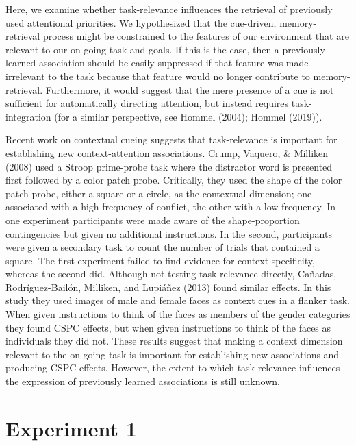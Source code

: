 \documentclass[english,,man,floatsintext]{apa6}
\begin{document}
Here, we examine whether task-relevance influences the retrieval of previously used attentional priorities. We hypothesized that the cue-driven, memory-retrieval process might be constrained to the features of our environment that are relevant to our on-going task and goals. If this is the case, then a previously learned association should be easily suppressed if that feature was made irrelevant to the task because that feature would no longer contribute to memory-retrieval. Furthermore, it would suggest that the mere presence of a cue is not sufficient for automatically directing attention, but instead requires task-integration (for a similar perspective, see Hommel (2004); Hommel (2019)).

Recent work on contextual cueing suggests that task-relevance is important for establishing new context-attention associations. Crump, Vaquero, \& Milliken (2008) used a Stroop prime-probe task where the distractor word is presented first followed by a color patch probe. Critically, they used the shape of the color patch probe, either a square or a circle, as the contextual dimension; one associated with a high frequency of conflict, the other with a low frequency. In one experiment participants were made aware of the shape-proportion contingencies but given no additional instructions. In the second, participants were given a secondary task to count the number of trials that contained a square. The first experiment failed to find evidence for context-specificity, whereas the second did. Although not testing task-relevance directly, Cañadas, Rodríguez-Bailón, Milliken, and Lupiáñez (2013) found similar effects. In this study they used images of male and female faces as context cues in a flanker task. When given instructions to think of the faces as members of the gender categories they found CSPC effects, but when given instructions to think of the faces as individuals they did not. These results suggest that making a context dimension relevant to the on-going task is important for establishing new associations and producing CSPC effects. However, the extent to which task-relevance influences the expression of previously learned associations is still unknown.

\hypertarget{experiment-1}{%
\section{Experiment 1}\label{experiment-1}}
\end{document}
